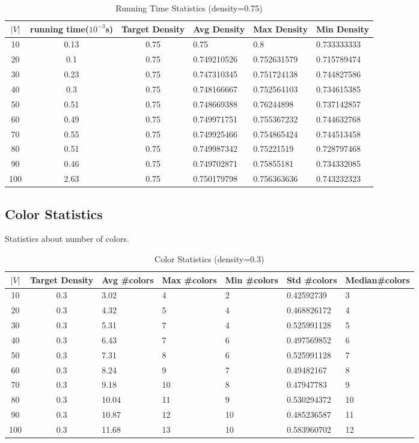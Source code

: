 \documentclass[paper=a4, fontsize=11pt]{scrartcl} %
\numberwithin{equation}{section} %
\numberwithin{figure}{section} %
\numberwithin{table}{section} %
\begin{document}
\begin{table}[H]
    \centering
    \begin{tabular}{ccclll}
    \toprule
$|V|$ & running time($10^{-3}$s) & Target Density & Avg Density & Max Density & Min Density\\ 
       \midrule
10 & 0.13 & 0.75 & 0.75 & 0.8 & 0.733333333\\ 
20 & 0.1 & 0.75 & 0.749210526 & 0.752631579 & 0.715789474\\ 
30 & 0.23 & 0.75 & 0.747310345 & 0.751724138 & 0.744827586\\ 
40 & 0.3 & 0.75 & 0.748166667 & 0.752564103 & 0.734615385\\ 
50 & 0.51 & 0.75 & 0.748669388 & 0.76244898 & 0.737142857\\ 
60 & 0.49 & 0.75 & 0.749971751 & 0.755367232 & 0.744632768\\ 
70 & 0.55 & 0.75 & 0.749925466 & 0.754865424 & 0.744513458\\ 
80 & 0.51 & 0.75 & 0.749987342 & 0.75221519 & 0.728797468\\ 
90 & 0.46 & 0.75 & 0.749702871 & 0.75855181 & 0.734332085\\ 
100 & 2.63 & 0.75 & 0.750179798 & 0.756363636 & 0.743232323\\ 
      \bottomrule
    \end{tabular}
    \caption{Running Time Statistics (density=0.75)}
    \label{tab:running time (density=0.75)}
\end{table}

\newpage
\subsection{Color Statistics}
Statistics about number of colors.

\begin{table}[H]
    \centering
    \begin{tabular}{cclllll}
    \toprule
$|V|$ & Target Density & Avg \#colors & Max \#colors &  Min \#colors & Std \#colors & Median\#colors\\ 
       \midrule
10 & 0.3 & 3.02 & 4 & 2 & 0.42592739 & 3\\ 
20 & 0.3 & 4.32 & 5 & 4 & 0.468826172 & 4\\ 
30 & 0.3 & 5.31 & 7 & 4 & 0.525991128 & 5\\ 
40 & 0.3 & 6.43 & 7 & 6 & 0.497569852 & 6\\ 
50 & 0.3 & 7.31 & 8 & 6 & 0.525991128 & 7\\ 
60 & 0.3 & 8.24 & 9 & 7 & 0.49482167 & 8\\ 
70 & 0.3 & 9.18 & 10 & 8 & 0.47947783 & 9\\ 
80 & 0.3 & 10.04 & 11 & 9 & 0.530294372 & 10\\ 
90 & 0.3 & 10.87 & 12 & 10 & 0.485236587 & 11\\ 
100 & 0.3 & 11.68 & 13 & 10 & 0.583960702 & 12\\ 
      \bottomrule
    \end{tabular}
    \caption{Color Statistics (density=0.3)}
    \label{tab:colors(density=0.3)}
\end{table}
\end{document}
